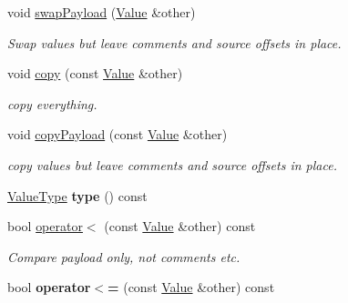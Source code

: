 \begin{DoxyCompactItemize}
\mbox{\label{classJson_1_1Value_a5263476047f20e2fc6de470e4de34fe5}} 
void \hyperlink{classJson_1_1Value_a5263476047f20e2fc6de470e4de34fe5}{swap\+Payload} (\hyperlink{classJson_1_1Value}{Value} \&other)
\begin{DoxyCompactList}\small\item\em Swap values but leave comments and source offsets in place. \end{DoxyCompactList}\item 
\mbox{\label{classJson_1_1Value_a1b2c6379664d91b9f1bcd4d1853e5970}} 
void \hyperlink{classJson_1_1Value_a1b2c6379664d91b9f1bcd4d1853e5970}{copy} (const \hyperlink{classJson_1_1Value}{Value} \&other)
\begin{DoxyCompactList}\small\item\em copy everything. \end{DoxyCompactList}\item 
\mbox{\label{classJson_1_1Value_ab504d299cfaa440392037fa8a3c54064}} 
void \hyperlink{classJson_1_1Value_ab504d299cfaa440392037fa8a3c54064}{copy\+Payload} (const \hyperlink{classJson_1_1Value}{Value} \&other)
\begin{DoxyCompactList}\small\item\em copy values but leave comments and source offsets in place. \end{DoxyCompactList}\item 
\mbox{\label{classJson_1_1Value_a8ce61157a011894f0252ceed232312de}} 
\hyperlink{namespaceJson_a7d654b75c16a57007925868e38212b4e}{Value\+Type} {\bfseries type} () const
\item 
\mbox{\label{classJson_1_1Value_aac6bd14155b88ed2d39ef54820b39e49}} 
bool \hyperlink{classJson_1_1Value_aac6bd14155b88ed2d39ef54820b39e49}{operator$<$} (const \hyperlink{classJson_1_1Value}{Value} \&other) const
\begin{DoxyCompactList}\small\item\em Compare payload only, not comments etc. \end{DoxyCompactList}\item 
\mbox{\label{classJson_1_1Value_a40c411a320a416d5eac0052b36211286}} 
bool {\bfseries operator$<$=} (const \hyperlink{classJson_1_1Value}{Value} \&other) const

\end{DoxyCompactItemize}
